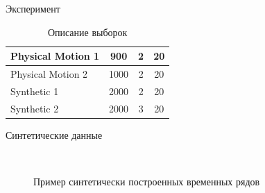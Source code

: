 \documentclass{beamer}
\begin{document}
\begin{frame}{Эксперимент}
\begin{table}[h]
	\begin{center}
	\caption{Описание выборок}
		\begin{tabular}{|c|c|c|c|}
		\hline
			\multicolumn{1}{|l|}{Physical Motion 1}
			& 900& 2& 20\\
			\hline
			\multicolumn{1}{|l|}{Physical Motion 2}
			& 1000& 2& 20\\
			\hline
			\multicolumn{1}{|l|}{Synthetic 1}
			& 2000& 2& 20\\
			\hline
			\multicolumn{1}{|l|}{Synthetic 2}
			& 2000& 3& 20\\
		\hline
		\end{tabular}
	\end{center}
\end{table}
\end{frame}
\begin{frame}{Синтетические данные}
	\begin{figure}[h!t]\center
		\\
		\caption{Пример синтетически построенных временных рядов}
	\end{figure}
\end{frame}
\end{document}
